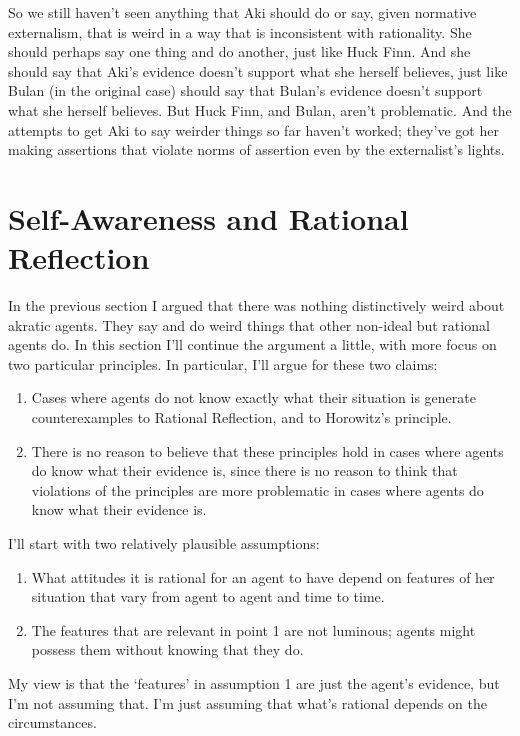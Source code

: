 So we still haven't seen anything that \gls{Aki} should do or say, given normative externalism, that is weird in a way that is inconsistent with rationality. She should perhaps say one thing and do another, just like \gls{Huck} Finn. And she should say that \gls{Aki}'s evidence doesn't support what she herself believes, just like \gls{Bulan} (in the original case) should say that \gls{Bulan}'s evidence doesn't support what she herself believes. But \gls{Huck} Finn, and \gls{Bulan}, aren't problematic. And the attempts to get \gls{Aki} to say weirder things so far haven't worked; they've got her making assertions that violate norms of assertion even by the externalist's lights.

\section{Self-Awareness and Rational Reflection}
\label{self-awarenessandrationalreflection}

In the previous section I argued that there was nothing distinctively weird about akratic agents. They say and do weird things that other non-ideal but rational agents do. In this section I'll continue the argument a little, with more focus on two particular principles. In particular, I'll argue for these two claims:

\begin{enumerate}
\item{} Cases where agents do not know exactly what their situation is generate counterexamples to Rational Reflection, and to Horowitz's principle.

\item{} There is no reason to believe that these principles hold in cases where agents do know what their evidence is, since there is no reason to think that violations of the principles are more problematic in cases where agents do know what their evidence is.

\end{enumerate}
I'll start with two relatively plausible assumptions:

\begin{enumerate}
\item{} What attitudes it is rational for an agent to have depend on features of her situation that vary from agent to agent and time to time.

\item{} The features that are relevant in point 1 are not luminous; agents might possess them without knowing that they do.

\end{enumerate}
My view is that the `features' in assumption 1 are just the agent's evidence, but I'm not assuming that. I'm just assuming that what's rational depends on the circumstances.

